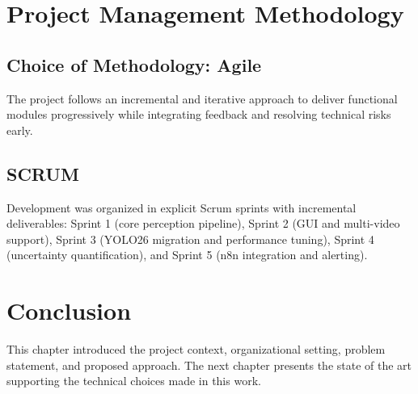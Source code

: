 \section{Project Management Methodology}

\subsection{Choice of Methodology: Agile}
The project follows an incremental and iterative approach to deliver functional modules progressively while integrating feedback and resolving technical risks early.

\subsection{SCRUM}
Development was organized in explicit Scrum sprints with incremental deliverables: Sprint 1 (core perception pipeline), Sprint 2 (GUI and multi-video support), Sprint 3 (YOLO26 migration and performance tuning), Sprint 4 (uncertainty quantification), and Sprint 5 (n8n integration and alerting).

\section{Conclusion}
This chapter introduced the project context, organizational setting, problem statement, and proposed approach. The next chapter presents the state of the art supporting the technical choices made in this work.
